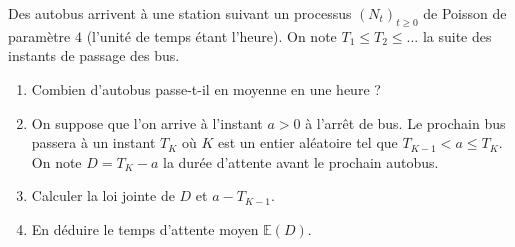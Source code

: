 \documentclass[solutions]{exercices}
\begin{document}
\begin{exercice}
Des autobus arrivent à une station suivant un processus $(N_t)_{t\ge0}$ de Poisson de paramètre $4$ (l'unité de temps étant l'heure). On note $T_1\le T_2\le ...$ la suite des instants de passage des bus.
\begin{enumerate}
\item Combien d'autobus passe-t-il en moyenne en une heure ?
\item On suppose que l'on arrive à l'instant $a>0$ à l'arrêt de bus. Le prochain bus passera à un instant $T_K$ où $K$ est un entier aléatoire tel que $T_{K-1}<a \le T_K$.
On note $D=T_K-a$ la durée d'attente avant le prochain autobus.
\item Calculer la loi jointe de $D$ et $a-T_{K-1}$.
\item En déduire le temps d'attente moyen $\mathbb{E}(D)$.
\end{enumerate}
\end{exercice}
\end{document}
